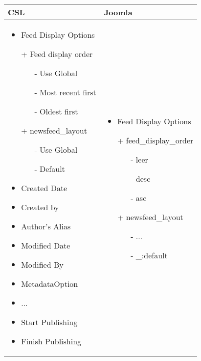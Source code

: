 \begin{minipage}{0.7\textwidth}
\begin{tabular}{|p{} | p{}|}
\hline
\textbf{CSL} & \textbf{Joomla} \\ 
\hline
\begin{itemize}
\item Feed Display Options
     \item[+] Feed display order
            	\begin{enumerate}
            		\item[-] Use Global
            		\item[-] Most recent first
            		\item[-] Oldest first
            	\end{enumerate}	
      \item[+] newsfeed\_layout
      	\begin{enumerate}
           		\item[-] Use Global
           		\item[-] Default
           	\end{enumerate}
 \item  Created Date
 \item  Created by
 \item  Author's Alias
 \item  Modified Date
 \item  Modified By
 \item  MetadataOption
 \item  ...
 \item  Start Publishing
 \item  Finish Publishing
\end{itemize}
 & 
\begin{itemize}
\item Feed Display Options
		\item[+] feed\_display\_order
	   	\begin{enumerate}
	   		\item[-] leer
	   		\item[-] desc
	   		\item[-] asc
	   	\end{enumerate}
        \item[+] newsfeed\_layout
         	\begin{enumerate}
          		\item[-] ...
          		\item[-] \_:default
             \end{enumerate}

\end{itemize}
\end{tabular}
\end{minipage}
